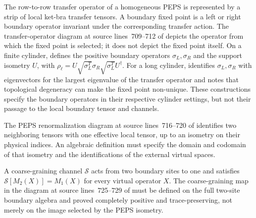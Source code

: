 \begin{definition}
    \label{def:peps_transfer_fixed_point}
    \notready
    The row-to-row transfer operator of a homogeneous PEPS is represented by a
    strip of local ket-bra transfer tensors. A boundary fixed point is a left or
    right boundary operator invariant under the corresponding transfer action.
    The transfer-operator diagram at source lines~709--712 of
    \cite{Cirac2016MPDO_arXiv} depicts the operator from which the fixed point is
    selected; it does not depict the fixed point itself. On a finite cylinder,
    \cite[Section~II.2, Equations~(10)--(13)]{Cirac2011Entanglement} defines the
    positive boundary operators $\sigma_L,\sigma_R$ and the support isometry
    $U$, with
    $\rho_\ell=U\sqrt{\sigma_L^T}\sigma_R\sqrt{\sigma_L^T}U^\dagger$.
    For a long cylinder, \cite[Equation~(1) and the following paragraph]
    {Schuch2013Topological} identifies $\sigma_L,\sigma_R$ with eigenvectors for
    the largest eigenvalue of the transfer operator and notes that topological
    degeneracy can make the fixed point non-unique. These constructions specify
    the boundary operators in their respective cylinder settings, but not their
    passage to the local boundary tensor and channels.
\end{definition}

\begin{definition}
    \label{def:peps_rfp_relation}
    \notready
    The PEPS renormalization diagram at source lines~716--720 of
    \cite{Cirac2016MPDO_arXiv} identifies two neighboring tensors with one
    effective local tensor, up to an isometry on their physical indices. An
    algebraic definition must specify the domain and codomain of that isometry
    and the identifications of the external virtual spaces.
\end{definition}

\begin{definition}
    \label{def:peps_boundary_coarse_graining}
    \notready
    A coarse-graining channel $\mathcal S$ acts from two boundary sites to one
    and satisfies $\mathcal S[M_2(X)]=M_1(X)$ for every virtual operator $X$.
    The coarse-graining map in the diagram at source lines~725--729 of
    \cite{Cirac2016MPDO_arXiv} must be defined on the full two-site boundary
    algebra and proved completely positive and trace-preserving, not merely on
    the image selected by the PEPS isometry.
\end{definition}

